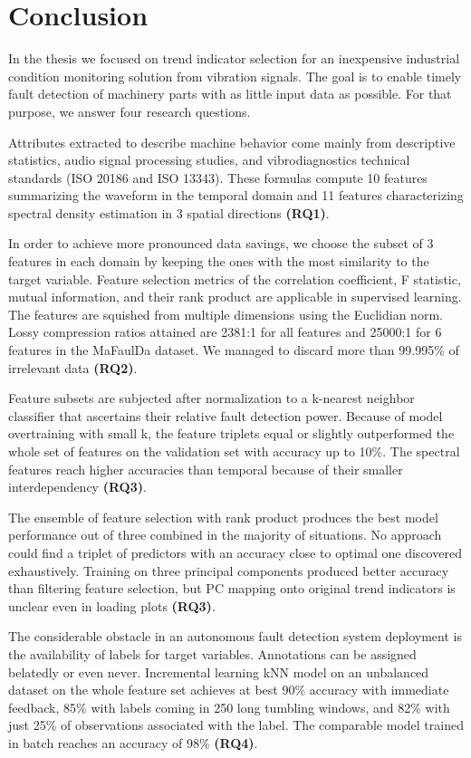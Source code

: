 \chapter{Conclusion} \label{section:conclusion}  
In the thesis we focused on trend indicator selection for an inexpensive industrial condition monitoring solution from vibration signals. The goal is to enable timely fault detection of machinery parts with as little input data as possible. For that purpose, we answer four research questions.

Attributes extracted to describe machine behavior come mainly from descriptive statistics, audio signal processing studies, and vibrodiagnostics technical standards (ISO 20186 and ISO 13343). These formulas compute 10 features summarizing the waveform in the temporal domain and 11 features characterizing spectral density estimation in 3 spatial directions \textbf{(RQ1)}.

In order to achieve more pronounced data savings, we choose the subset of 3 features in each domain by keeping the ones with the most similarity to the target variable. Feature selection metrics of the correlation coefficient, F statistic, mutual information, and their rank product are applicable in supervised learning. The features are squished from multiple dimensions using the Euclidian norm. Lossy compression ratios attained are 2381:1 for all features and 25000:1 for 6 features in the MaFaulDa dataset. We managed to discard more than 99.995\% of irrelevant data \textbf{(RQ2)}.

Feature subsets are subjected after normalization to a k-nearest neighbor classifier that ascertains their relative fault detection power. Because of model overtraining with small k, the feature triplets equal or slightly outperformed the whole set of features on the validation set with accuracy up to 10\%. The spectral features reach higher accuracies than temporal because of their smaller interdependency \textbf{(RQ3)}. 

The ensemble of feature selection with rank product produces the best model performance out of three combined in the majority of situations. No approach could find a triplet of predictors with an accuracy close to optimal one discovered exhaustively. Training on three principal components produced better accuracy than filtering feature selection, but PC mapping onto original trend indicators is unclear even in loading plots \textbf{(RQ3)}.

The considerable obstacle in an autonomous fault detection system deployment is the availability of labels for target variables. Annotations can be assigned belatedly or even never. Incremental learning kNN model on an unbalanced dataset on the whole feature set achieves at best 90\% accuracy with immediate feedback, 85\% with labels coming in 250 long tumbling windows, and 82\% with just 25\% of observations associated with the label. The comparable model trained in batch reaches an accuracy of 98\% \textbf{(RQ4)}.

